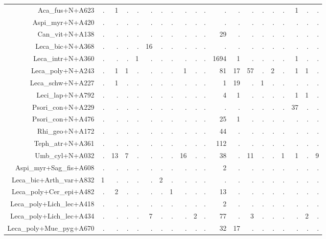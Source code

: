 \documentclass[a4paper, 11]{article}\usepackage[]{graphicx}\usepackage[]{color}
\begin{document}
\begin{table}
\begin{tabular}{rrrrrrrrrrrrrrrrrrrr}
  \hline
Aca\_fus+N+A623 & . & 1 & . & . & . & . & . & . & . & . & . & . & . & . & . & . & 1 & . & . \\ 
  Aspi\_myr+N+A420 & . & . & . & . & . & . & . & . & . & . & . & . & . & . & . & . & . & . & . \\ 
  Can\_vit+N+A138 & . & . & . & . & . & . & . & . & . & . & 29 & . & . & . & . & . & . & . & . \\ 
  Leca\_bic+N+A368 & . & . & . & . & 16 & . & . & . & . & . & . & . & . & . & . & . & . & . & . \\ 
  Leca\_intr+N+A360 & . & . & . & 1 & . & . & . & . & . & . & 1694 & 1 & . & . & . & . & 1 & . & . \\ 
  Leca\_poly+N+A243 & . & 1 & 1 & . & . & . & . & 1 & . & . & 81 & 17 & 57 & . & 2 & . & 1 & 1 & . \\ 
  Leca\_schw+N+A227 & . & 1 & . & . & . & . & . & . & . & . & 1 & 19 & . & 1 & . & . & . & . & . \\ 
  Leci\_lap+N+A792 & . & . & . & . & . & . & . & . & . & . & 4 & 1 & . & . & . & . & 1 & 1 & . \\ 
  Psori\_con+N+A229 & . & . & . & . & . & . & . & . & . & . & . & . & . & . & . & . & 37 & . & . \\ 
  Psori\_con+N+A476 & . & . & . & . & . & . & . & . & . & . & 25 & 1 & . & . & . & . & . & . & . \\ 
  Rhi\_geo+N+A172 & . & . & . & . & . & . & . & . & . & . & 44 & . & . & . & . & . & . & . & . \\ 
  Teph\_atr+N+A361 & . & . & . & . & . & . & . & . & . & . & 112 & . & . & . & . & . & . & . & . \\ 
  Umb\_cyl+N+A032 & . & 13 & 7 & . & . & . & . & 16 & . & . & 38 & . & 11 & . & . & 1 & 1 & . & 9 \\ 
  Aspi\_myr+Sag\_fis+A608 & . & . & . & . & . & . & . & . & . & . & 2 & . & . & . & . & . & . & . & . \\ 
  Leca\_bic+Arth\_var+A832 & 1 & . & . & . & . & 2 & . & . & . & . & . & . & . & . & . & . & . & . & . \\ 
  Leca\_poly+Cer\_epi+A482 & . & 2 & . & . & . & . & 1 & . & . & . & 13 & . & . & . & . & . & . & . & . \\ 
  Leca\_poly+Lich\_lec+A418 & . & . & . & . & . & . & . & . & . & . & 2 & . & . & . & . & . & . & . & . \\ 
  Leca\_poly+Lich\_lec+A434 & . & . & . & . & 7 & . & . & . & 2 & . & 77 & . & 3 & . & . & . & . & 2 & . \\ 
  Leca\_poly+Mue\_pyg+A670 & . & . & . & . & . & . & . & . & . & . & 32 & 17 & . & . & . & . & . & . & . \\ 

\end{tabular}
\end{table}
\end{document}
